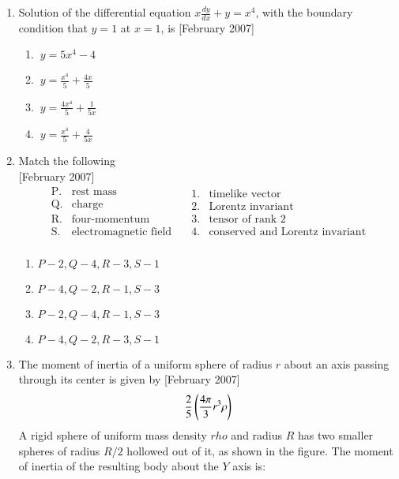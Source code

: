 \documentclass[journal]{IEEEtran}
\begin{document}
\begin{enumerate}
\item Solution of the differential equation $ x \frac{dy}{dx} + y = x^4 $, with the boundary condition that $ y = 1 $ at  $x = 1$, is \hfill[February 2007]
\begin{enumerate}
\item $ \ y = 5x^4 - 4$
\item $\ y = \frac{x^4}{5} + \frac{4x}{5} $
\item $ \ y = \frac{4x^4}{5} + \frac{1}{5x} $
\item $\ y = \frac{x^4}{5} + \frac{4}{5x} $
\end{enumerate} 
\item Match the following \\ \hfill[February 2007] \[
\begin{array}{cl}
\text{P.} & \text{rest mass} \\
\text{Q.} & \text{charge} \\
\text{R.} & \text{four-momentum} \\
\text{S.} & \text{electromagnetic field} \\
\end{array}
\quad
\begin{array}{cl}
1. & \text{timelike vector} \\
2. & \text{Lorentz invariant} \\
3. & \text{tensor of rank 2} \\
4. & \text{conserved and Lorentz invariant} \\
\end{array}
\]
\begin{enumerate}
    \item $P-2,Q-4,R-3,S-1$
    \item $P-4,Q-2,R-1,S-3$
    \item $P-2,Q-4,R-1,S-3$
    \item $P-4,Q-2,R-3,S-1$
    \end{enumerate}

\item The moment of inertia of a uniform sphere of radius  $r$ about an axis passing through its center is given by \hfill[February 2007]
\[
\frac{2}{5} \left(\frac{4\pi}{3} r^3 \rho \right)
\]
A rigid sphere of uniform mass density $rho$ and radius  $R$ has two smaller spheres of radius $ R/2$  hollowed out of it, as shown in the figure. The moment of inertia of the resulting body about the $Y$ axis is:
\begin{center}
\end{center}
\end{enumerate}
\end{document}
